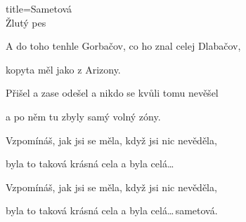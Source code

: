\begin{song}{title=\centering Sametová \\\normalsize Žlutý pes  \vspace*{-0.3cm}}
{\sloka
	A do toho tenhle Gorbačov, co ho znal celej Dlabačov,
	
	kopyta měl jako z Arizony.
	
	Přišel a zase odešel a nikdo se kvůli tomu nevěšel
	
	a po něm tu zbyly samý volný zóny.

	Vzpomínáš, jak jsi se měla, když jsi nic nevěděla,
	
	byla to taková krásná cela a byla celá\elipsa\dots\,
	 
	Vzpomínáš, jak jsi se měla, když jsi nic nevěděla,
	
	byla to taková krásná cela a byla celá\elipsa\dots\,sametová.

}
\setcounter{Slokočet}{0}
\end{song}


